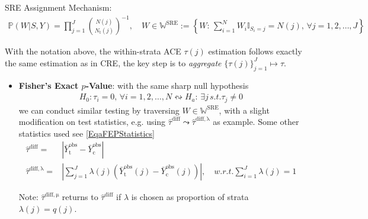SRE Assignment Mechanism:
\begin{align}
    \mathbb{P}\left( W|S,Y \right)=\prod_{j=1}^J\binom{N(j)}{N_\mathrm{t}(j) }^{-1},\quad W\in\mathbb{W}^\mathrm{SRE}:=\left\{ W:\, \sum_{i=1}^N W_i\mathbb{I}_{S_i=j}=N(j),\,\forall j=1,2,\ldots,J \right\}   
\end{align}

With the notation above, the within-strata ACE $ \tau(j) $ estimation follows exactly the same estimation as in CRE, the key step is to \textit{aggregate} $ \{\tau(j)\}_{j=1}^J \mapsto \tau $.

\begin{itemize}[topsep=2pt,itemsep=0pt]
    \item \textbf{Fisher's Exact $ p $-Value}: with the same sharp null hypothesis
    \begin{align}
        H_0:\tau_i=0,\,\forall i=1,2,\ldots,N  \leftrightsquigarrow H_a:\,\exists j\,s.t. \tau_j\neq 0
    \end{align}
    we can conduct similar testing by traversing $ W\in\mathbb{W}^\mathrm{SRE} $, with a slight modification on test statistics, e.g. using $ \hat{\tau}^\mathrm{diff} \leadsto \hat{\tau}^\mathrm{diff,\lambda }  $ as example. Some other statistics used see \autoref{EqaFEPStatistics}
    \begin{align}
        \hat{\tau}^\mathrm{diff}=& \left| \bar{Y}^\mathrm{obs}_\mathrm{t}-\bar{Y}^\mathrm{obs}_\mathrm{c} \right|\\
        \hat{\tau}^\mathrm{diff,\lambda }=& \left| \sum_{j=1}^J\lambda (j)\left(\bar{Y}^\mathrm{obs}_\mathrm{t}(j)-\bar{Y}^\mathrm{obs}_\mathrm{c}(j)\right) \right| ,\quad w.r.t. \sum_{i=1}^J\lambda (j)=1
    \end{align}
    
    Note: $ \hat{\tau}^\mathrm{diff,\mu }  $ returns to $\hat{\tau}^\mathrm{diff}$ if $ \lambda  $ is chosen as proportion of strata $ \lambda (j)=q(j) $.
    

\end{itemize}
